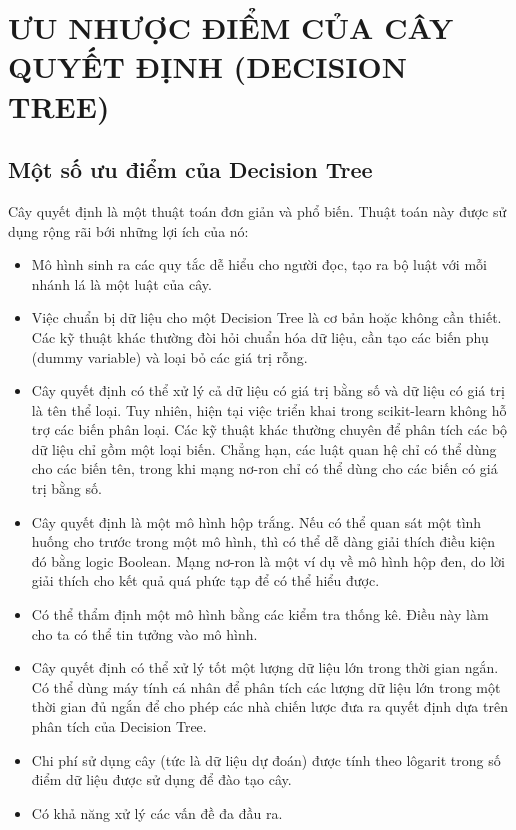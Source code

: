 \chapter{ƯU NHƯỢC ĐIỂM CỦA CÂY QUYẾT ĐỊNH (DECISION TREE)}

\section{Một số ưu điểm của Decision Tree}
Cây quyết định là một thuật toán đơn giản và phổ biến. Thuật toán này được sử dụng rộng rãi bới những lợi ích của nó:

\begin{itemize}
    \item Mô hình sinh ra các quy tắc dễ hiểu cho người đọc, tạo ra bộ luật với mỗi nhánh lá là một luật của cây.
    \item Việc chuẩn bị dữ liệu cho một Decision Tree là cơ bản hoặc không cần thiết. Các kỹ thuật khác thường đòi hỏi chuẩn hóa dữ liệu, cần tạo các biến phụ (dummy variable) và loại bỏ các giá trị rỗng.
    \item Cây quyết định có thể xử lý cả dữ liệu có giá trị bằng số và dữ liệu có giá trị là tên thể loại. Tuy nhiên, hiện tại việc triển khai trong scikit-learn không hỗ trợ các biến phân loại. Các kỹ thuật khác thường chuyên để phân tích các bộ dữ liệu chỉ gồm một loại biến. Chẳng hạn, các luật quan hệ chỉ có thể dùng cho các biến tên, trong khi mạng nơ-ron chỉ có thể dùng cho các biến có giá trị bằng số.
    \item Cây quyết định là một mô hình hộp trắng. Nếu có thể quan sát một tình huống cho trước trong một mô hình, thì có thể dễ dàng giải thích điều kiện đó bằng logic Boolean. Mạng nơ-ron là một ví dụ về mô hình hộp đen, do lời giải thích cho kết quả quá phức tạp để có thể hiểu được.
    \item Có thể thẩm định một mô hình bằng các kiểm tra thống kê. Điều này làm cho ta có thể tin tưởng vào mô hình.
    \item Cây quyết định có thể xử lý tốt một lượng dữ liệu lớn trong thời gian ngắn. Có thể dùng máy tính cá nhân để phân tích các lượng dữ liệu lớn trong một thời gian đủ ngắn để cho phép các nhà chiến lược đưa ra quyết định dựa trên phân tích của Decision Tree.
    \item Chi phí sử dụng cây (tức là dữ liệu dự đoán) được tính theo lôgarit trong số điểm dữ liệu được sử dụng để đào tạo cây.
    \item Có khả năng xử lý các vấn đề đa đầu ra.
\end{itemize}

